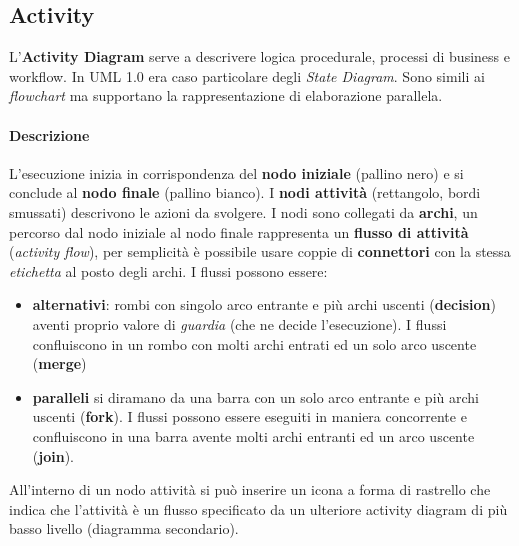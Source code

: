 \subsection{Activity}

L'\textbf{Activity Diagram} serve a descrivere logica procedurale, processi di business e workflow. In UML 1.0 era caso particolare degli \textit{State Diagram}. Sono simili ai \textit{flowchart} ma supportano la rappresentazione di elaborazione parallela.

\paragraph{Descrizione} L'esecuzione inizia in corrispondenza del \textbf{nodo iniziale} (pallino nero) e si conclude al \textbf{nodo finale} (pallino bianco). I \textbf{nodi attività} (rettangolo, bordi smussati) descrivono le azioni da svolgere. I nodi sono collegati da \textbf{archi}, un percorso dal nodo iniziale al nodo finale rappresenta un \textbf{flusso di attività} (\textit{activity flow}), per semplicità è possibile usare coppie di \textbf{connettori} con la stessa \textit{etichetta} al posto degli archi. I flussi possono essere:
\begin{itemize}
    \item \textbf{alternativi}: rombi con singolo arco entrante e più archi uscenti (\textbf{decision}) aventi proprio valore di \textit{guardia} (che ne decide l'esecuzione). I flussi confluiscono in un rombo con molti archi entrati ed un solo arco uscente (\textbf{merge})
    \item \textbf{paralleli} si diramano da una barra con un solo arco entrante e più archi uscenti (\textbf{fork}). I flussi possono essere eseguiti in maniera concorrente e confluiscono in una barra avente molti archi entranti ed un arco uscente (\textbf{join}).
\end{itemize}
All'interno di un nodo attività si può inserire un icona a forma di rastrello che indica che l'attività è un flusso specificato da un ulteriore activity diagram di più basso livello (diagramma secondario).

